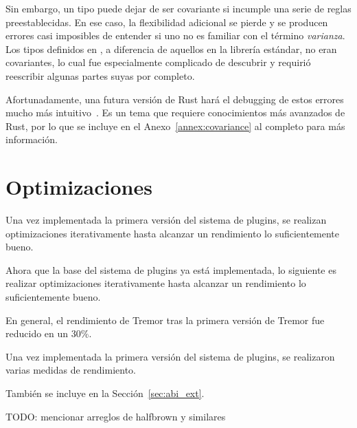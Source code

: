 Sin embargo, un tipo puede dejar de ser covariante si incumple una serie de
reglas preestablecidas. En ese caso, la flexibilidad adicional se pierde y se
producen errores casi imposibles de entender si uno no es familiar con el
término \emph{varianza}. Los tipos definidos en \abistable, a diferencia de
aquellos en la librería estándar, no eran covariantes, lo cual fue especialmente
complicado de descubrir y requirió reescribir algunas partes suyas por completo.

Afortunadamente, una futura versión de Rust hará el debugging de estos errores
mucho más intuitivo~\cite{smarterchecker}. Es un tema que requiere conocimientos
más avanzados de Rust, por lo que se incluye en el Anexo~\ref{annex:covariance}
al completo para más información.

\section{Optimizaciones}

Una vez implementada la primera versión del sistema de plugins, se realizan
optimizaciones iterativamente hasta alcanzar un rendimiento lo suficientemente
bueno.

Ahora que la base del sistema de plugins ya está implementada, lo siguiente es
realizar optimizaciones iterativamente hasta alcanzar un rendimiento lo
suficientemente bueno.

En general, el rendimiento de Tremor tras la primera versión de Tremor fue
reducido en un 30\%.

Una vez implementada la primera versión del sistema de plugins, se realizaron
varias medidas de rendimiento.

También se incluye en la Sección~\ref{sec:abi_ext}.

TODO: mencionar arreglos de halfbrown y similares
